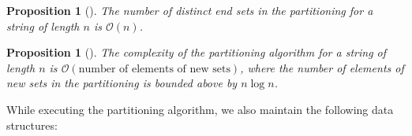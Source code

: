\documentclass[preprint,12pt]{elsarticle}
\newcommand{\cO}{\ensuremath{\mathcal{O}}}
\newtheorem{proposition}[theorem]{Proposition}
\begin{document}
\begin{proposition}[\cite{Iliopoulos96}]
\label{thm distinct end sets}
The number of distinct end sets in the partitioning for a string of length $n$ is $\cO(n)$.
\end{proposition}

\begin{proposition}[\cite{C81}]
\label{Crochemore}
The complexity of the partitioning algorithm for a string of length $n$ is
$\cO(\text{number of elements of new sets})$, where the number of elements of new sets in the partitioning
is bounded above by $n\log n$.
\end{proposition}


While executing the partitioning algorithm, we also maintain the following data structures:
\end{document}
